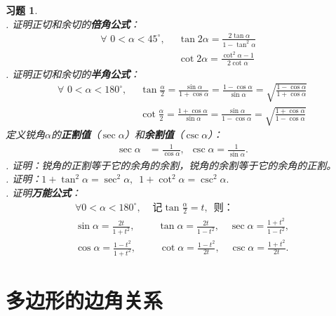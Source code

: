 \documentclass[12pt,UTF8]{ctexbook}
\newtheorem{xt}{习题}[section]
\begin{document}
\begin{xt}\label{xt:2-5-10}
    \mbox{} \\
    . 证明正切和余切的\textbf{倍角公式}：
    \begin{align*}
        \forall \,\, 0 < \alpha < 45^\circ, \,\,\,& \tan 2\alpha = \frac{2\tan \alpha}{1 - \tan^2 \alpha} &  \\
        &\cot 2\alpha = \frac{\cot^2 \alpha - 1}{2 \cot \alpha} &  
    \end{align*}
    . 证明正切和余切的\textbf{半角公式}：
    \begin{align*}
        \forall \,\, 0 < \alpha < 180^\circ, \,\,\,& \tan \frac{\alpha}{2} = \frac{\sin \alpha}{1 + \cos \alpha} = \frac{1 - \cos \alpha}{\sin \alpha} = \sqrt{\frac{1 - \cos \alpha}{1 + \cos \alpha}} \\
        & \cot \frac{\alpha}{2} = \frac{1 + \cos \alpha}{\sin \alpha} = \frac{\sin \alpha}{1 - \cos \alpha} = \sqrt{\frac{1 + \cos \alpha}{1 - \cos \alpha}}  
    \end{align*}
    定义锐角$\alpha$的\textbf{正割值}（$\sec \alpha$）和\textbf{余割值}（$\csc \alpha$）：
    \begin{align*}
        \sec \alpha &= \frac{1}{\cos \alpha}, \,\,\, \csc \alpha = \frac{1}{\sin \alpha}.  
    \end{align*}
    . 证明：锐角的正割等于它的余角的余割，锐角的余割等于它的余角的正割。\\
    . 证明：$ 1 + \tan^2 \alpha = \sec^2 \alpha , \,\,\, 1 + \cot^2 \alpha = \csc^2 \alpha. $\\
    . 证明\textbf{万能公式}：
    \begin{align*}
        \forall 0 < \alpha < 180^\circ, & \mbox{ 记} \tan\frac{\alpha}{2} = t, \,\,\, \mbox{则：} \\
        \sin \alpha = \frac{2t}{1 + t^2}, & \,\,\,\,\, \tan \alpha = \frac{2t}{1 - t^2}, \,\,\,\,\,\, \sec \alpha = \frac{1 + t^2}{1 -t^2},  \\
        \cos \alpha = \frac{1 -t^2}{1 + t^2}, & \,\,\,\,\,\, \cot \alpha = \frac{1 - t^2}{2t}, \,\,\,\,\,\, \csc \alpha = \frac{1 + t^2}{2t}.   
    \end{align*}
\end{xt}

\section{多边形的边角关系}
\end{document}
